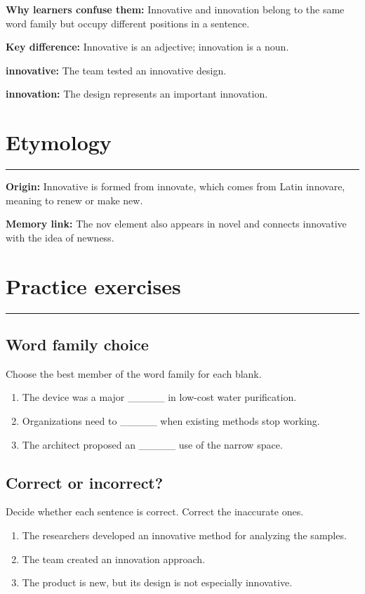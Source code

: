 \documentclass[11pt]{article}
\newcommand{\sectionrule}{\par\vspace{-0.5em}\noindent\textcolor{Accent}{\rule{\linewidth}{0.6pt}}\par}
\begin{document}
\textbf{Why learners confuse them:} Innovative and innovation belong to the same word family but occupy different positions in a sentence.

\textbf{Key difference:} Innovative is an adjective; innovation is a noun.

\textbf{innovative:} The team tested an innovative design.

\textbf{innovation:} The design represents an important innovation.

\section{Etymology}
\sectionrule
\textbf{Origin:} Innovative is formed from innovate, which comes from Latin innovare, meaning to renew or make new.

\textbf{Memory link:} The nov element also appears in novel and connects innovative with the idea of newness.

\section{Practice exercises}
\sectionrule
\subsection{Word family choice}
Choose the best member of the word family for each blank.

\begin{enumerate}
  \item The device was a major \_\_\_\_\_ in low-cost water purification.
  \item Organizations need to \_\_\_\_\_ when existing methods stop working.
  \item The architect proposed an \_\_\_\_\_ use of the narrow space.
\end{enumerate}

\subsection{Correct or incorrect?}
Decide whether each sentence is correct. Correct the inaccurate ones.

\begin{enumerate}
  \item The researchers developed an innovative method for analyzing the samples.
  \item The team created an innovation approach.
  \item The product is new, but its design is not especially innovative.
\end{enumerate}
\end{document}
